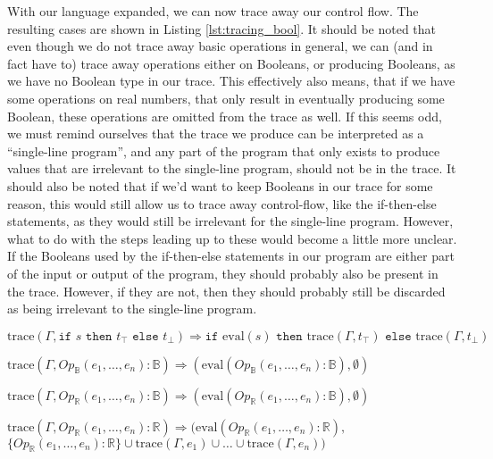         With our language expanded, we can now trace away our control flow.
        The resulting cases are shown in Listing \ref{lst:tracing_bool}.
        It should be noted that even though we do not trace away basic operations in general, we can (and in fact have to) trace away operations either on Booleans, or producing Booleans, as we have no Boolean type in our trace.
        This effectively also means, that if we have some operations on real numbers, that only result in eventually producing some Boolean, these operations are omitted from the trace as well.
        If this seems odd, we must remind ourselves that the trace we produce can be interpreted as a ``single-line program'', and any part of the program that only exists to produce values that are irrelevant to the single-line program, should not be in the trace.
        It should also be noted that if we'd want to keep Booleans in our trace for some reason, this would still allow us to trace away control-flow, like the if-then-else statements, as they would still be irrelevant for the single-line program.
        However, what to do with the steps leading up to these would become a little more unclear.
        If the Booleans used by the if-then-else statements in our program are either part of the input or output of the program, they should probably also be present in the trace.
        However, if they are not, then they should probably still be discarded as being irrelevant to the single-line program.

        \begin{quicklst}[caption=Control flow tracing, label=lst:tracing_bool, gobble=12]
            $\text{trace}(\Gamma,\texttt{if }s\texttt{ then }t_\top\texttt{ else }t_\bot)\Rightarrow\texttt{if }\text{eval}(s)\texttt{ then }\text{trace}(\Gamma,t_\top)\texttt{ else }\text{trace}(\Gamma,t_\bot)$

            $\text{trace}(\Gamma,Op_\mathbb{B}(e_1,\dots,e_n):\mathbb{B})\Rightarrow(\text{eval}(Op_\mathbb{B}(e_1,\dots,e_n):\mathbb{B}),\emptyset)$

            $\text{trace}(\Gamma,Op_\mathbb{R}(e_1,\dots,e_n):\mathbb{B})\Rightarrow(\text{eval}(Op_\mathbb{R}(e_1,\dots,e_n):\mathbb{B}),\emptyset)$

            $\text{trace}(\Gamma,Op_\mathbb{R}(e_1,\dots,e_n):\mathbb{R})\Rightarrow(\text{eval}(Op_\mathbb{R}(e_1,\dots,e_n):\mathbb{R}),$
                $\{Op_\mathbb{R}(e_1,\dots,e_n):\mathbb{R}\}\cup\text{trace}(\Gamma,e_1)\cup\dots\cup\text{trace}(\Gamma,e_n))$
        \end{quicklst}

